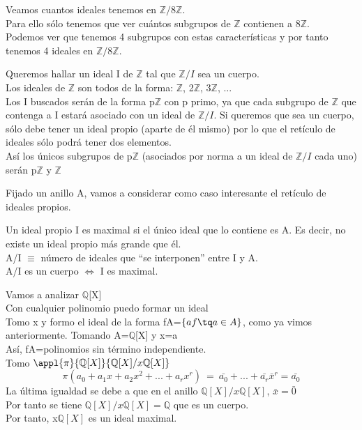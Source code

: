 \documentclass[nochap]{apuntes}
\begin{document}
\begin{example}
 Veamos cuantos ideales tenemos en $\mathbb{Z}/8\mathbb{Z}$. \\
 Para ello sólo tenemos que ver cuántos subgrupos de $\mathbb{Z}$  contienen a $8\mathbb{Z}$. \\
 Podemos ver que tenemos 4 subgrupos con estas características y por tanto tenemos 4 ideales en $\mathbb{Z}/8\mathbb{Z}$.
\end{example}
\begin{example}
 Queremos hallar un ideal I de $\mathbb{Z}$ tal que $\mathbb{Z}/I$  sea un cuerpo.\\
 Los ideales de $\mathbb{Z}$ son todos de la forma: $\mathbb{Z}$, 2$\mathbb{Z}$, 3$\mathbb{Z}$, ... \\
 Los I buscados serán de la forma p$\mathbb{Z}$  con p primo, ya que cada subgrupo de $\mathbb{Z}$ que contenga a I estará asociado
 con un ideal de $\mathbb{Z}/I$. Si queremos que sea un cuerpo, sólo debe tener un ideal propio (aparte de él mismo) por lo que el 
 retículo de ideales sólo podrá tener dos elementos.\\
 Así los únicos subgrupos de p$\mathbb{Z}$  (asociados por norma a un ideal de $\mathbb{Z}/I$  cada uno) serán p$\mathbb{Z}$  y $\mathbb{Z}$
 
\end{example}

Fijado un anillo A, vamos a considerar como caso interesante el retículo de ideales propios.
\begin{defn}[Maximal]
 Un ideal propio I es maximal si el único ideal que lo contiene es A. Es decir, no existe un ideal propio más grande que él.\\
 A/I $\equiv$  número de ideales que ``se interponen''  entre I y A.\\
 A/I es un cuerpo $\Leftrightarrow$  I es maximal.
\end{defn}
\begin{example}
 Vamos a analizar $\mathbb{Q}$[X]\\
 Con cualquier polinomio puedo formar un ideal\\
 Tomo x y formo el ideal de la forma fA=$\{af \tq a\in A\}$, como ya vimos anteriormente. Tomando A=$\mathbb{Q}$[X] y x=a\\
 Así, fA=polinomios sin término independiente.\\
 Tomo $\appl{\pi}{\mathbb{Q}[X]}{\mathbb{Q}[X]/x\mathbb{Q}[X]}$\\
 \[\pi(a_0+a_1x+a_2x^{2}+...+a_rx^{r}) \ = \ \bar{a_0}+...+\bar{a_r}\bar{x}^{r} = \bar{a_0}\]
 La última igualdad se debe a que en el anillo $\mathbb{Q}[X]/x\mathbb{Q}[X]$, $\bar{x}=\bar{0}$\\
 Por tanto se tiene $\mathbb{Q}[X]/x\mathbb{Q}[X]=\mathbb{Q}$  que es un cuerpo.\\
 Por tanto, x$\mathbb{Q}[X]$  es un ideal maximal.
\end{example}
\end{document}
